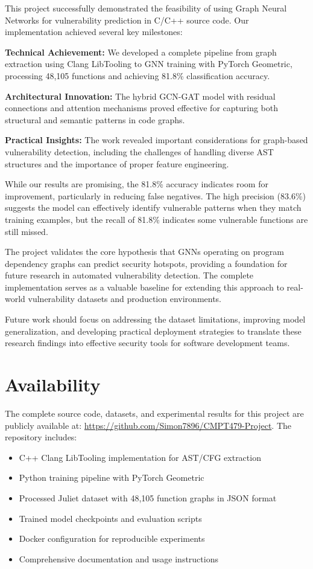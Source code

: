 This project successfully demonstrated the feasibility of using Graph Neural Networks for vulnerability prediction in C/C++ source code. Our implementation achieved several key milestones:

\textbf{Technical Achievement:} We developed a complete pipeline from graph extraction using Clang LibTooling to GNN training with PyTorch Geometric, processing 48,105 functions and achieving 81.8\% classification accuracy.

\textbf{Architectural Innovation:} The hybrid GCN-GAT model with residual connections and attention mechanisms proved effective for capturing both structural and semantic patterns in code graphs.

\textbf{Practical Insights:} The work revealed important considerations for graph-based vulnerability detection, including the challenges of handling diverse AST structures and the importance of proper feature engineering.

While our results are promising, the 81.8\% accuracy indicates room for improvement, particularly in reducing false negatives. The high precision (83.6\%) suggests the model can effectively identify vulnerable patterns when they match training examples, but the recall of 81.8\% indicates some vulnerable functions are still missed.

The project validates the core hypothesis that GNNs operating on program dependency graphs can predict security hotspots, providing a foundation for future research in automated vulnerability detection. The complete implementation serves as a valuable baseline for extending this approach to real-world vulnerability datasets and production environments.

Future work should focus on addressing the dataset limitations, improving model generalization, and developing practical deployment strategies to translate these research findings into effective security tools for software development teams.

\section*{Availability}

The complete source code, datasets, and experimental results for this project are publicly available at: \url{https://github.com/Simon7896/CMPT479-Project}. The repository includes:
\begin{itemize}
\item C++ Clang LibTooling implementation for AST/CFG extraction
\item Python training pipeline with PyTorch Geometric
\item Processed Juliet dataset with 48,105 function graphs in JSON format
\item Trained model checkpoints and evaluation scripts
\item Docker configuration for reproducible experiments
\item Comprehensive documentation and usage instructions
\end{itemize}

